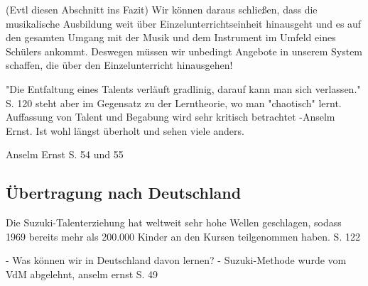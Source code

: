 (Evtl diesen Abschnitt ins Fazit)
Wir können daraus schließen, dass die musikalische Ausbildung weit über
Einzelunterrichtseinheit hinausgeht und es auf den gesamten Umgang mit der Musik
und dem Instrument im Umfeld eines Schülers ankommt. Deswegen müssen wir
unbedingt Angebote in unserem System schaffen, die über den Einzelunterricht
hinausgehen! 



"Die Entfaltung eines Talents verläuft gradlinig, darauf kann man sich
verlassen." S. 120 \autocite[120]{suzuki:erziehung_ist_liebe} steht aber im Gegensatz zu der Lerntheorie, wo man
"chaotisch" lernt.
Auffassung von Talent und Begabung wird sehr kritisch betrachtet -Anselm Ernst. Ist wohl
längst überholt und sehen viele anders.



Anselm Ernst S. 54 und 55


\subsection{Übertragung nach Deutschland}

Die Suzuki-Talenterziehung hat weltweit sehr hohe Wellen geschlagen, sodass 1969
bereits mehr als 200.000 Kinder an den Kursen teilgenommen haben. S. 122

- Was können wir in Deutschland davon lernen? 
- Suzuki-Methode wurde vom VdM abgelehnt, anselm ernst S. 49
